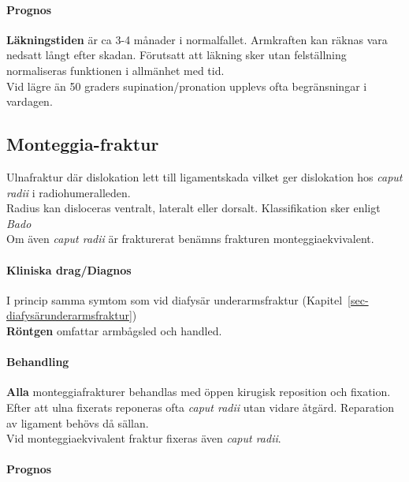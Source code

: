 \documentclass[
  letterpaper,
  DIV=11,
  numbers=noendperiod]{scrreport}
\let\oldparagraph\paragraph
\renewcommand{\paragraph}[1]{\oldparagraph{#1}\mbox{}}
\begin{document}
\hypertarget{prognos-3}{%
\paragraph{Prognos}\label{prognos-3}}

\textbf{Läkningstiden} är ca 3-4 månader i normalfallet. Armkraften kan
räknas vara nedsatt långt efter skadan. Förutsatt att läkning sker utan
felställning normaliseras funktionen i allmänhet med tid.\\
Vid lägre än 50 graders supination/pronation upplevs ofta begränsningar
i vardagen.

\hypertarget{monteggia-fraktur}{%
\subsection{Monteggia-fraktur}\label{monteggia-fraktur}}

Ulnafraktur där dislokation lett till ligamentskada vilket ger
dislokation hos \emph{caput radii} i radiohumeralleden.\\
Radius kan disloceras ventralt, lateralt eller dorsalt. Klassifikation
sker enligt \emph{Bado}\\
Om även \emph{caput radii} är frakturerat benämns frakturen
monteggiaekvivalent.

\hypertarget{kliniska-dragdiagnos-5}{%
\paragraph{Kliniska drag/Diagnos}\label{kliniska-dragdiagnos-5}}

I princip samma symtom som vid diafysär underarmsfraktur
(Kapitel~\ref{sec-diafysärunderarmsfraktur})\\
\textbf{Röntgen} omfattar armbågsled och handled.

\hypertarget{behandling-5}{%
\paragraph{Behandling}\label{behandling-5}}

\textbf{Alla} monteggiafrakturer behandlas med öppen kirugisk reposition
och fixation. Efter att ulna fixerats reponeras ofta \emph{caput radii}
utan vidare åtgärd. Reparation av ligament behövs då sällan.\\
Vid monteggiaekvivalent fraktur fixeras även \emph{caput radii}.

\hypertarget{prognos-4}{%
\paragraph{Prognos}\label{prognos-4}}
\end{document}
